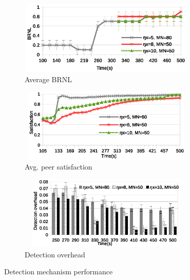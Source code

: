 \begin{figure}[tb]
  \centering
  \begin{subfigure}[c]{0.95\columnwidth}
    \centering
    \includegraphics[width=8.4cm,height=3.5cm]{./Figures/det-BRNL1.eps}
    \caption{Average BRNL}%
    \label{subfig:BRNL}
  \end{subfigure}
  \begin{subfigure}[c]{0.95\columnwidth}
    \centering
    \includegraphics[width=8.4cm,height=3.5cm]{./Figures/det-sat.eps}
    \caption{Avg. peer satisfaction}%
    \label{subfig:det-sat}
  \end{subfigure}
  \begin{subfigure}[c]{0.95\columnwidth}
    \centering
    \includegraphics[width=8.4cm,height=3.5cm]{./Figures/overhead.eps}
    \caption{Detection overhead}%
    \label{subfig:overhead}
  \end{subfigure}
  \caption{Detection mechanism performance}%
  \label{fig:detection-results}
   \vspace{-4.5mm}
\end{figure}


